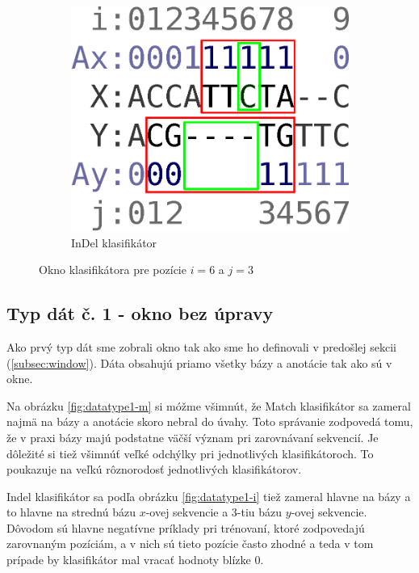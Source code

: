 \begin{figure}[h]
\begin{subfigure}[b]{0.35\textwidth}
                \includegraphics[width=\textwidth]{images/window_i}
                \caption{InDel klasifikátor}
                \label{fig:window-i}
        \end{subfigure}
        \caption[Okno klasifikátora]{Okno klasifikátora pre pozície $i = 6$ a $j = 3$}
\end{figure}


\subsection{Typ dát č. 1 - okno bez úpravy}
\label{subsec:datatype1}

Ako prvý typ dát sme zobrali okno tak ako sme ho definovali v predošlej sekcii (\ref{subsec:window}). Dáta obsahujú priamo všetky bázy a anotácie tak ako sú v okne.

Na obrázku \ref{fig:datatype1-m} si móžme všimnút, že Match klasifikátor sa zameral najmä na bázy a anotácie skoro nebral do úvahy.
Toto správanie zodpovedá tomu, že v praxi bázy majú podstatne väčší význam pri zarovnávaní sekvencií.
Je dôležité si tiež všimnúť veľké odchýlky pri jednotlivých klasifikátoroch. To poukazuje na veľkú rôznorodosť jednotlivých klasifikátorov.

Indel klasifikátor sa podľa obrázku \ref{fig:datatype1-i} tiež zameral hlavne na bázy a to hlavne na strednú bázu $x$-ovej sekvencie a 3-tiu bázu $y$-ovej sekvencie. Dôvodom sú hlavne negatívne príklady pri trénovaní, ktoré zodpovedajú zarovnaným pozíciám, a v nich sú tieto pozície často zhodné a teda v tom prípade by klasifikátor mal vracať hodnoty blízke 0.

